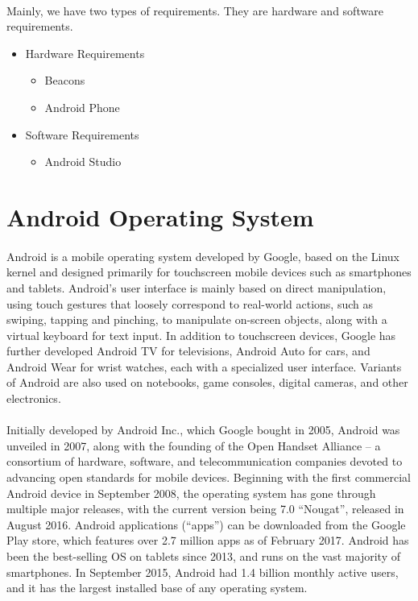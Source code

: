 \documentclass[a4paper,12pt]{report}
\begin{document}
\paragraph{} Mainly, we have two types of requirements. They are hardware and software requirements.
\begin{itemize}
	\item Hardware Requirements
	\begin{itemize}
		\item Beacons
		\item Android Phone
	\end{itemize}
	\item Software Requirements
	\begin{itemize}
		\item Android Studio
	\end{itemize}
\end{itemize}
\section{Android Operating System}
\paragraph{} Android is a mobile operating system developed by Google, based on the Linux kernel and designed primarily for touchscreen mobile devices such as smartphones and tablets. Android's user interface is mainly based on direct manipulation, using touch gestures that loosely correspond to real-world actions, such as swiping, tapping and pinching, to manipulate on-screen objects, along with a virtual keyboard for text input. In addition to touchscreen devices, Google has further developed Android TV for televisions, Android Auto for cars, and Android Wear for wrist watches, each with a specialized user interface. Variants of Android are also used on notebooks, game consoles, digital cameras, and other electronics.
\paragraph{} Initially developed by Android Inc., which Google bought in 2005, Android was unveiled in 2007, along with the founding of the Open Handset Alliance – a consortium of hardware, software, and telecommunication companies devoted to advancing open standards for mobile devices. Beginning with the first commercial Android device in September 2008, the operating system has gone through multiple major releases, with the current version being 7.0 ``Nougat'', released in August 2016. Android applications (``apps'') can be downloaded from the Google Play store, which features over 2.7 million apps as of February 2017. Android has been the best-selling OS on tablets since 2013, and runs on the vast majority of smartphones. In September 2015, Android had 1.4 billion monthly active users, and it has the largest installed base of any operating system.
\end{document}
